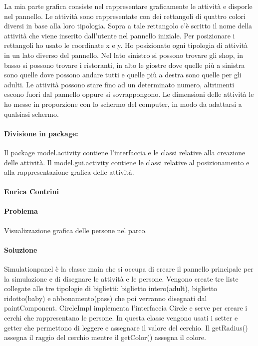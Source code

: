 \documentclass[a4paper,12pt]{report}
\begin{document}
La mia parte grafica consiste nel rappresentare graficamente le attività e disporle nel pannello.
Le attività sono rappresentate con dei rettangoli di quattro colori diversi in base alla loro tipologia. Sopra a tale rettangolo c’è scritto il nome della attività che viene inserito dall’utente nel pannello iniziale. 
Per posizionare i rettangoli ho usato le coordinate x e y. Ho posizionato ogni tipologia di attività in un lato diverso del pannello. Nel lato sinistro si possono trovare gli shop, in basso si possono trovare i ristoranti, in alto le giostre dove quelle più a sinistra sono quelle dove possono andare tutti e quelle più a destra sono quelle per gli adulti. Le attività possono stare fino ad un determinato numero, altrimenti escono fuori dal pannello oppure si sovrappongono.
Le dimensioni delle attività le ho messe in proporzione con lo schermo del computer, in modo da adattarsi a qualsiasi schermo. 

\paragraph{Divisione in package:} Il package model.activity contiene l’interfaccia e le classi relative alla creazione delle attività. Il model.gui.activity contiene le classi relative al posizionamento e alla rappresentazione grafica delle attività.


\paragraph{Enrica Contrini}
\paragraph{Problema} Visualizzazione grafica delle persone nel parco.
\paragraph{Soluzione}Simulationpanel è la classe main che si occupa di creare il pannello principale per la simulazione e di disegnare le attività e le persone.
Vengono create tre liste collegate alle tre tipologie di biglietti: biglietto intero(adult), biglietto ridotto(baby) e abbonamento(pass) che poi verranno disegnati dal paintComponent.
CircleImpl implementa l’interfaccia Circle e serve per creare i cerchi che rappresentano le persone. In questa classe vengono usati i setter e getter che permettono di leggere e assegnare il valore del cerchio. Il getRadius() assegna il raggio del cerchio mentre il getColor() assegna il colore.
\end{document}
